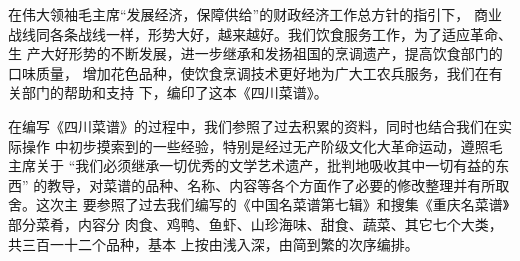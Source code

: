 %
%
%
%
%
%
%
\begin{center}%
\Large\bfseries%
{}%
\end{center}%

在伟大领袖毛主席{\sffamily“发展经济，保障供给”}的财政经济工作总方针的指引下，
商业战线同各条战线一样，形势大好，越来越好。我们饮食服务工作，为了适应革命、生
产大好形势的不断发展，进一步继承和发扬祖国的烹调遗产，提高饮食部门的口味质量，
增加花色品种，使饮食烹调技术更好地为广大工农兵服务，我们在有关部门的帮助和支持
下，编印了这本《四川菜谱》。

在编写《四川菜谱》的过程中，我们参照了过去积累的资料，同时也结合我们在实际操作
中初步摸索到的一些经验，特别是经过无产阶级文化大革命运动，遵照毛主席关于%
{\sffamily“我们必须继承一切优秀的文学艺术遗产，批判地吸收其中一切有益的东西”}%
的教导，对菜谱的品种、名称、内容等各个方面作了必要的修改整理并有所取舍。这次主
要参照了过去我们编写的《中国名菜谱第七辑》和搜集《重庆名菜谱》部分菜肴，内容分
肉食、鸡鸭、鱼虾、山珍海味、甜食、蔬菜、其它七个大类，共三百一十二个品种，基本
上按由浅入深，由简到繁的次序编排。


